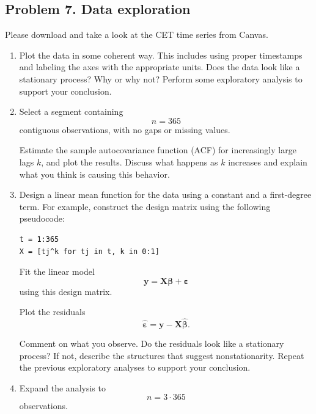 \documentclass[lang=en,11pt,a4paper,citestyle =authoryear]{elegantpaper}
\begin{document}
\subsection*{Problem 7. Data exploration}

Please download and take a look at the CET time series from Canvas.

\begin{enumerate}[label=\arabic*., leftmargin=*]

    \item
    Plot the data in some coherent way. This includes using proper
    timestamps and labeling the axes with the appropriate units. Does the data look like a stationary process? Why or why not? Perform some exploratory analysis to support your conclusion.

    \item
    Select a segment containing
    \[
        n=365
    \]
    contiguous observations, with no gaps or missing values.

    Estimate the sample autocovariance function (ACF) for increasingly
    large lags \(k\), and plot the results. Discuss what happens as
    \(k\) increases and explain what you think is causing this behavior.

    \item
    Design a linear mean function for the data using a constant and a first-degree term.
    For example, construct the design matrix using the following
    pseudocode:

\begin{lstlisting}
t = 1:365
X = [tj^k for tj in t, k in 0:1]
\end{lstlisting}

    Fit the linear model
    \[
        \mathbf{y}
        =
        \mathbf{X}\boldsymbol{\beta}
        +
        \boldsymbol{\varepsilon}
    \]
    using this design matrix.

    Plot the residuals
    \[
        \widehat{\boldsymbol{\varepsilon}}
        =
        \mathbf{y}
        -
        \mathbf{X}\widehat{\boldsymbol{\beta}}.
    \]

    Comment on what you observe. Do the residuals look like a stationary
    process? If not, describe the structures that suggest
    nonstationarity. Repeat the previous exploratory analyses to support
    your conclusion.

    \item[\textbf{4\(^{\ast}\).}]
    Expand the analysis to
    \[
        n=3\cdot365
    \]
    observations.


\end{enumerate}
\end{document}
